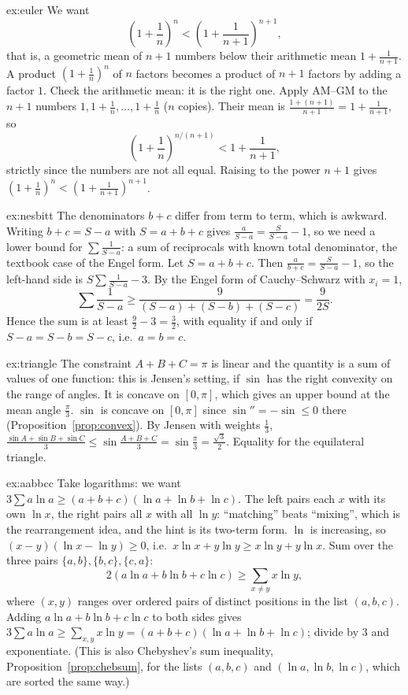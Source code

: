 \begin{solution}{ex:euler}
\idea We want
\[
\left(1+\frac1n\right)^n<\left(1+\frac1{n+1}\right)^{n+1},
\]
that is, a geometric mean of $n+1$ numbers below their arithmetic mean $1+\frac1{n+1}$. A product $\left(1+\frac1n\right)^n$ of $n$ factors becomes a product of $n+1$ factors by adding a factor $1$. Check the arithmetic mean: it is the right one.
\writeup Apply AM--GM to the $n+1$ numbers $1,1+\frac1n,\dots,1+\frac1n$ ($n$ copies). Their mean is $\frac{1+(n+1)}{n+1}=1+\frac1{n+1}$, so
\[
\left(1+\frac1n\right)^{n/(n+1)}<1+\frac1{n+1},
\]
strictly since the numbers are not all equal. Raising to the power $n+1$ gives $\left(1+\frac1n\right)^n<\left(1+\frac1{n+1}\right)^{n+1}$.
\end{solution}

\begin{solution}{ex:nesbitt}
\idea The denominators $b+c$ differ from term to term, which is awkward. Writing $b+c=S-a$ with $S=a+b+c$ gives $\frac a{S-a}=\frac S{S-a}-1$, so we need a lower bound for $\sum\frac1{S-a}$: a sum of reciprocals with known total denominator, the textbook case of the Engel form.
\writeup Let $S=a+b+c$. Then $\frac a{b+c}=\frac S{S-a}-1$, so the left-hand side is $S\sum\frac1{S-a}-3$. By the Engel form of Cauchy--Schwarz
with $x_i=1$,
\[
\sum\frac1{S-a}\ge\frac9{(S-a)+(S-b)+(S-c)}=\frac9{2S}.
\]
Hence the sum is at least $\frac92-3=\frac32$, with equality if and only if $S-a=S-b=S-c$, i.e.\ $a=b=c$.
\end{solution}

\begin{solution}{ex:triangle}
\idea The constraint $A+B+C=\pi$ is linear and the quantity is a sum of values of one function: this is Jensen's setting, if $\sin$ has the right convexity on the range of angles. It is concave on $[0,\pi]$, which gives an upper bound at the mean angle $\frac\pi3$.
\writeup $\sin$ is concave on $[0,\pi]$ since $\sin''=-\sin\le0$ there (Proposition~\ref{prop:convex}). By Jensen with weights $\frac13$,
$\frac{\sin A+\sin B+\sin C}3\le\sin\frac{A+B+C}3=\sin\frac\pi3=\frac{\sqrt3}2$. Equality for the equilateral triangle.
\end{solution}

\begin{solution}{ex:aabbcc}
\idea Take logarithms: we want $3\sum a\ln a\ge(a+b+c)(\ln a+\ln b+\ln c)$. The left pairs each $x$ with its own $\ln x$, the right pairs all $x$ with all $\ln y$: ``matching'' beats ``mixing'', which is the rearrangement idea, and the hint is its two-term form.
\writeup $\ln$ is increasing, so $(x-y)(\ln x-\ln y)\ge0$, i.e.\ $x\ln x+y\ln y\ge x\ln y+y\ln x$. Sum over the three pairs $\{a,b\},\{b,c\},\{c,a\}$:
\[
2(a\ln a+b\ln b+c\ln c)\ge\sum_{x\ne y}x\ln y,
\]
where $(x,y)$ ranges over ordered pairs of distinct positions in the list $(a,b,c)$. Adding $a\ln a+b\ln b+c\ln c$ to both sides gives $3\sum a\ln a\ge\sum_{x,y}x\ln y=(a+b+c)(\ln a+\ln b+\ln c)$;
divide by $3$ and exponentiate. (This is also Chebyshev's sum inequality, Proposition~\ref{prop:chebsum}, for the lists $(a,b,c)$ and $(\ln a,\ln b,\ln c)$, which are sorted the same way.)
\end{solution}

